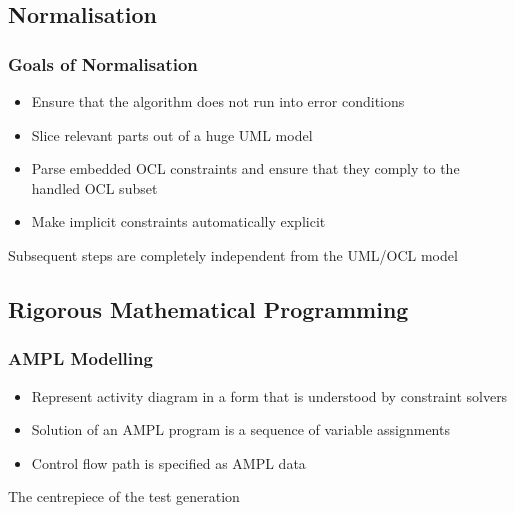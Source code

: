 \documentclass{beamer}
\begin{document}
\subsection{Normalisation}
\begin{frame}
\frametitle{Goals of Normalisation}
\begin{itemize}
  \item Ensure that the algorithm does not run into error conditions
  \item Slice relevant parts out of a huge UML model
  \item Parse embedded OCL constraints and ensure that they comply to the handled OCL subset
  \item Make implicit constraints automatically explicit
\end{itemize}
\begin{block}{}
Subsequent steps are completely independent from the UML/OCL model
\end{block}
\end{frame}

\subsection{Rigorous Mathematical Programming}
\begin{frame}
\frametitle{AMPL Modelling \cite{AMPL}}
\begin{itemize}
  \item Represent activity diagram in a form that is understood by constraint solvers
  \item Solution of an AMPL program is a sequence of variable assignments
  \item Control flow path is specified as AMPL data
\end{itemize}
\begin{block}{}
The centrepiece of the test generation
\end{block}
\end{frame}

\end{document}
